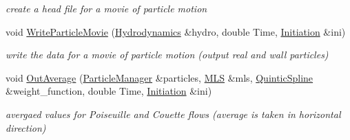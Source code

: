 \begin{CompactItemize}
\begin{CompactList}\small\item\em create a head file for a movie of particle motion \item\end{CompactList}\item 
void \hyperlink{classOutput_3ff4c5c04d9f7e89eb3f36b299256f10}{WriteParticleMovie} (\hyperlink{classHydrodynamics}{Hydrodynamics} \&hydro, double Time, \hyperlink{classInitiation}{Initiation} \&ini)
\begin{CompactList}\small\item\em write the data for a movie of particle motion (output real and wall particles) \item\end{CompactList}\item 
void \hyperlink{classOutput_13b9be49d851806b4ab40d60624095ad}{OutAverage} (\hyperlink{classParticleManager}{ParticleManager} \&particles, \hyperlink{classMLS}{MLS} \&mls, \hyperlink{classQuinticSpline}{QuinticSpline} \&weight\_\-function, double Time, \hyperlink{classInitiation}{Initiation} \&ini)
\begin{CompactList}\small\item\em avergaed values for Poiseuille and Couette flows (average is taken in horizontal direction) \item\end{CompactList}\end{CompactItemize}
